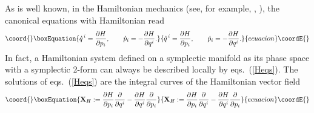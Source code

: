\documentclass[12pt,a4paper]{article}
\providecommand{\dd}{\mathrm{d}}
\providecommand{\vect}{\mathbf}
\providecommand{\at}[1]{\big|_{#1}}
\providecommand{\omits}[1]{}
\begin{document}
As is well known, \omits{ the classical mechanics is well
established (see, for example, \cite{Arnold}, \cite{AM}). In the
classical mechanics, the systems with potential can be described
by both the Hamiltonian and Lagrangian formalism.}in the
Hamiltonian mechanics (see, for example, \cite{Arnold},
\cite{AM}), the canonical equations with Hamiltonian \coordHE{} read
\begin{equation}\coord{}\boxEquation{
  \dot{q}^{\,i} = \frac{\partial H}{\partial p_i}, \qquad
  \dot{p}_i = - \frac{\partial H}{\partial q^i}.
\label{Heqs}
}{
  \dot{q}^{\,i} = \frac{\partial H}{\partial p_i}, \qquad
  \dot{p}_i = - \frac{\partial H}{\partial q^i}.
}{ecuacion}\coordE{}\end{equation}
\omits{For an autonomous system, the Hamiltonian \myHighlight{$H$}\coordHE{} manifestly
independent of the time \myHighlight{$t$}\coordHE{} is a function on the phase
space.}\omits{ \myHighlight{$\mathcal{M}$}\coordHE{}, the cotangent bundle of the
configuration space.} In fact, a Hamiltonian system  defined on a
symplectic manifold \coordHE{} as its phase space
\omits{where \myHighlight{$\mathcal{M}$}\coordHE{} is a \myHighlight{$2n$}\coordHE{}-dimensional orientable
differentiable manifold endowed} with a symplectic 2-form
\myHighlight{$\omega$}\coordHE{}\omits{For the details of Hamiltonian mechanics on a
symplectic manifold, see, for example, \cite{Arnold}. According to
Darboux's theorem,} \omits{for each point \myHighlight{$x$}\coordHE{} in \myHighlight{$\mathcal{M}$}\coordHE{},
there is a coordinate neighborhood \myHighlight{$(U; q^1,
\dots,q^n,p_1,\dots,p_n)$}\coordHE{} of \myHighlight{$x$}\coordHE{} such that\footnote{ Repeated
indices are always assumed to be summed over 1 to \myHighlight{$n$}\coordHE{} unless
otherwise stated. For convenience, symbols such like
\myHighlight{$\omega\at{U}$}\coordHE{} are always abbreviated as \myHighlight{$\omega$}\coordHE{} later. }and
locally we always have
\begin{equation}\coord{}\boxEquation{
  \omega = \dd p_i\wedge\dd q^i, \qquad i=1, \cdots, n.
\label{omegadef}
}{
  \omega = \dd p_i\wedge\dd q^i, \qquad i=1, \cdots, n.
}{ecuacion}\coordE{}\end{equation}
Thus a Hamiltonian system %
on \myHighlight{$(\mathcal{M}^{2n},\omega)$}\coordHE{} }can always be described locally by
eqs.~(\ref{Heqs}). The solutions of eqs.~(\ref{Heqs}) are the
integral curves of the Hamiltonian vector field
\begin{equation}\coord{}\boxEquation{
  \vect{X}_H := \frac{\partial H}{\partial p_i}
    \frac{\partial}{\partial q^i}
  - \frac{\partial H}{\partial q^i}\frac{\partial}{\partial p_i}
}{
  \vect{X}_H := \frac{\partial H}{\partial p_i}
    \frac{\partial}{\partial q^i}
  - \frac{\partial H}{\partial q^i}\frac{\partial}{\partial p_i}
}{ecuacion}\coordE{}\end{equation}
\end{document}
